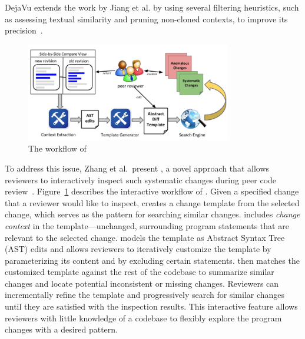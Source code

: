 \documentclass[runningheads,a4paper]{llncs}
\begin{document}
DejaVu extends the work by Jiang et al. by using several filtering
heuristics, such as assessing textual similarity and pruning
non-cloned contexts, to improve its
precision~\cite{Gabel2010:dejavu}. 

\begin{figure}[ht]
 \centering
 \includegraphics[width=0.8\textwidth]{images/critics-workflow.pdf}
 \caption{The workflow of {\critics}}
 \label{fig:critics-workflow}
\end{figure}

To address this issue, Zhang et al.~present {\critics}, a novel approach that allows reviewers to interactively inspect such systematic changes during peer code review~\cite{zhang2015interactive}. Figure~\ref{fig:critics-workflow} describes the interactive workflow of {\critics}. Given a specified change that a reviewer would like to inspect, {\critics} creates a change template from the selected change, which serves as the pattern for searching similar changes. {\critics} includes {\em change context} in the template---unchanged, surrounding program statements that are relevant to the selected change. {\critics} models the template as Abstract Syntax Tree (AST) edits and allows reviewers to iteratively customize the template by parameterizing its content and by excluding certain statements. {\critics} then matches the customized template against the rest of the codebase to summarize similar changes and locate potential inconsistent or missing changes. Reviewers can incrementally refine the template and progressively search for similar changes until they are satisfied with the inspection results. This interactive feature allows reviewers with little knowledge of a codebase to flexibly explore the program changes with a desired pattern.
\end{document}
